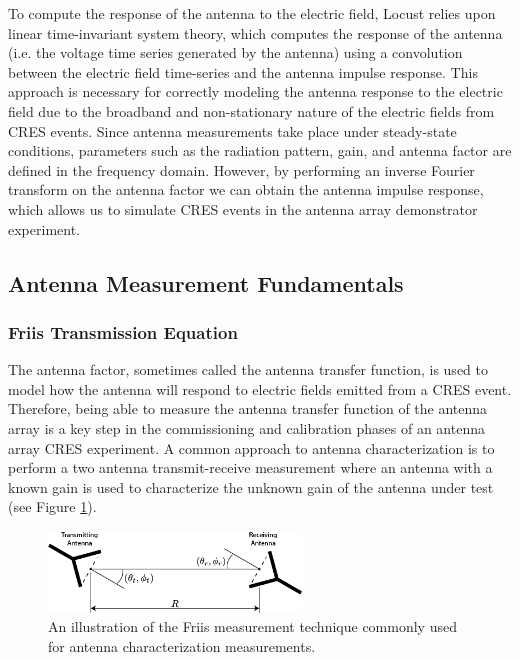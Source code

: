 To compute the response of the antenna to the electric field, Locust relies upon linear time-invariant system theory, which computes the response of the antenna (i.e. the voltage time series generated by the antenna) using a convolution between the electric field time-series and the antenna impulse response. This approach is necessary for correctly modeling the antenna response to the electric field due to the broadband and non-stationary nature of the electric fields from CRES events. Since antenna measurements take place under steady-state conditions, parameters such as the radiation pattern, gain, and antenna factor are defined in the frequency domain. However, by performing an inverse Fourier transform on the antenna factor we can obtain the antenna impulse response, which allows us to simulate CRES events in the antenna array demonstrator experiment. 

\subsection{Antenna Measurement Fundamentals}
\subsubsection{Friis Transmission Equation}

The antenna factor, sometimes called the antenna transfer function, is used to model how the antenna will respond to electric fields emitted from a CRES event. Therefore, being able to measure the antenna transfer function of the antenna array is a key step in the commissioning and calibration phases of an antenna array CRES experiment. A common approach to antenna characterization is to perform a two antenna transmit-receive measurement where an antenna with a known gain is used to characterize the unknown gain of the antenna under test (see Figure \ref{fig:friis-meas}). 
\begin{figure}[htbp]
    \centering
    \includegraphics[width=0.6\textwidth]{figs/Chapter-5/230409_friis_figure.png}
    \caption{An illustration of the Friis measurement technique commonly used for antenna characterization measurements.}
    \label{fig:friis-meas}
\end{figure}

